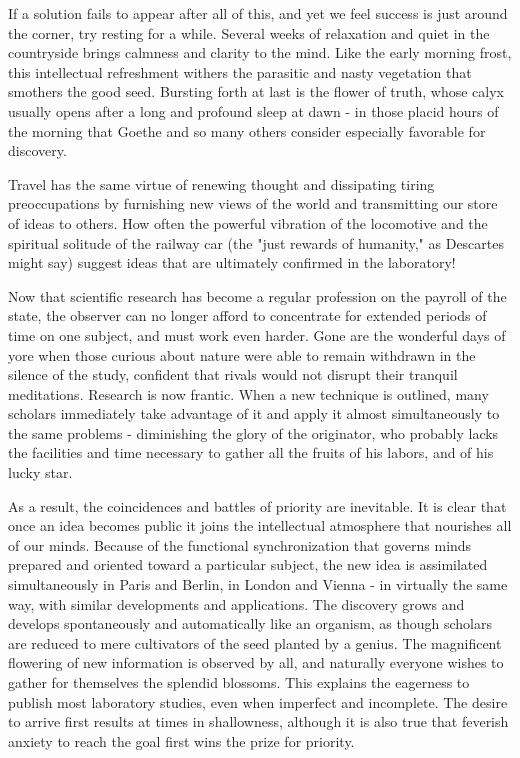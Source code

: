 \documentclass{article}
\begin{document}
If a solution fails to appear after all of this, and yet we feel success is just around the corner, try resting for a while. Several weeks of relaxation and quiet in the countryside brings calmness and clarity to the mind. Like the early morning frost, this intellectual refreshment withers the parasitic and nasty vegetation that smothers the good seed. Bursting forth at last is the flower of truth, whose calyx usually opens after a long and profound sleep at dawn - in those placid hours of the morning that Goethe and so many others consider especially favorable for discovery.

Travel has the same virtue of renewing thought and dissipating tiring preoccupations by furnishing new views of the world and transmitting our store of ideas to others. How often the powerful vibration of the locomotive and the spiritual solitude of the railway car (the "just rewards of humanity," as Descartes might say) suggest ideas that are ultimately confirmed in the laboratory!

Now that scientific research has become a regular profession on the payroll of the state, the observer can no longer afford to concentrate for extended periods of time on one subject, and must work even harder. Gone are the wonderful days of yore when those curious about nature were able to remain withdrawn in the silence of the study, confident that rivals would not disrupt their tranquil meditations. Research is now frantic. When a new technique is outlined, many scholars immediately take advantage of it and apply it almost simultaneously to the same problems - diminishing the glory of the originator, who probably lacks the facilities and time necessary to gather all the fruits of his labors, and of his lucky star.

As a result, the coincidences and battles of priority are inevitable. It is clear that once an idea becomes public it joins the intellectual atmosphere that nourishes all of our minds. Because of the functional synchronization that governs minds prepared and oriented toward a particular subject, the new idea is assimilated simultaneously in Paris and Berlin, in London and Vienna - in virtually the same way, with similar developments and applications. The discovery grows and develops spontaneously and automatically like an organism, as though scholars are reduced to mere cultivators of the seed planted by a genius. The magnificent flowering of new information is observed by all, and naturally everyone wishes to gather for themselves the splendid blossoms. This explains the eagerness to publish most laboratory studies, even when imperfect and incomplete. The desire to arrive first results at times in shallowness, although it is also true that feverish anxiety to reach the goal first wins the prize for priority.
\end{document}
